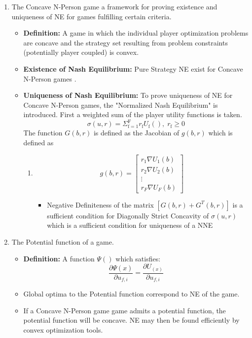 \documentclass[12pt,a4paper]{report}
\begin{document}
\begin{enumerate}
\item The Concave N-Person game a framework for proving existence and uniqueness of NE for games fulfilling certain criteria.

\begin{itemize}
\item
\textbf{Definition:} A game in which the individual player optimization problems are concave and the strategy set resulting from problem constraints (potentially player coupled) is convex.
\item 
\textbf{Existence of Nash Equilibrium:} Pure Strategy NE exist for Concave N-Person  games \cite[Thm1]{rosen1964existence}. 
\item
\textbf{Uniqueness of Nash Equilibrium:} To prove uniqueness of NE for Concave N-Person  games, the "Normalized Nash Equilibrium" is introduced.
First a weighted sum of the player utility functions is taken.
\begin{equation}
\sigma(u,r)  = \Sigma_{\mathrm{f=1}}^{\mathrm{F}} r_{\mathrm{f}}U_{\mathrm{f}}(), \; 
r_{\mathrm{f}} \geq 0
\end{equation}
 The function $G(b,r) $ is defined as the Jacobian of $g(b,r) $ which is defined as
\begin{enumerate}
\item  
\begin{equation}
g(b,r)= 
\begin{bmatrix}
r_1 \nabla U_{1}(b)
\\
r_2 \nabla U_{2}(b)
\\
\vdots\\
r_F \nabla U_{F}(b)
\end{bmatrix}
\end{equation}

\begin{itemize}
\item
Negative Definiteness of the matrix $[G(b,r)+G^{T}(b,r)] $ is a sufficient condition for Diagonally Strict Concavity of $\sigma(u,r)$ which is a sufficient condition for uniqueness of a NNE \cite[Thm4]{rosen1964existence}

\end{itemize}

\end{enumerate}
\end{itemize}
\item The Potential function of a game.
\begin{itemize}
\item
\textbf{Definition:} A function
$ \Psi()$ which satisfies:
\begin{equation}\label{potential_game_condition}
\frac{\partial \Psi(x)}{\partial u_{f,i}}
 =
 \frac{\partial U_(x)}{\partial u_{f,i}}
\end{equation}
\item Global optima to the Potential function correspond to NE of the game.
\item If a Concave N-Person game game admits a potential function, the potential function will be concave. NE may then be found efficiently by convex optimization tools. 
\end{itemize}




\end{enumerate}
\end{document}
